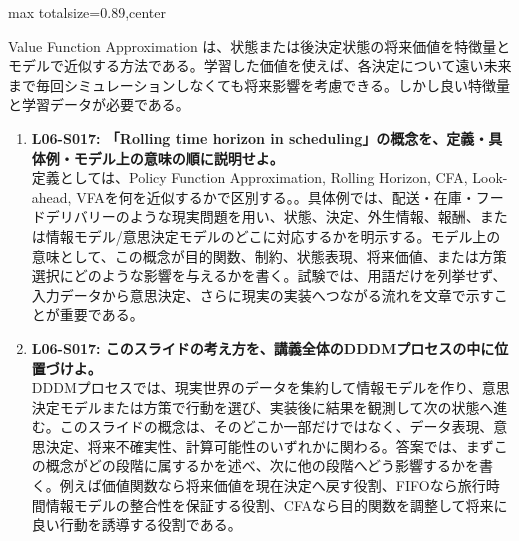 \begin{minipage}[t]{0.58\textwidth}
\begin{adjustbox}{max totalsize={\textwidth}{0.89\textheight},center}
\begin{minipage}{\textwidth}
Value Function Approximation は、状態または後決定状態の将来価値を特徴量とモデルで近似する方法である。学習した価値を使えば、各決定について遠い未来まで毎回シミュレーションしなくても将来影響を考慮できる。しかし良い特徴量と学習データが必要である。\par{}\begin{enumerate}\item \textbf{L06-S017: 「Rolling time horizon in scheduling」の概念を、定義・具体例・モデル上の意味の順に説明せよ。}\\定義としては、Policy Function Approximation, Rolling Horizon, CFA, Look-ahead, VFAを何を近似するかで区別する。。具体例では、配送・在庫・フードデリバリーのような現実問題を用い、状態、決定、外生情報、報酬、または情報モデル/意思決定モデルのどこに対応するかを明示する。モデル上の意味として、この概念が目的関数、制約、状態表現、将来価値、または方策選択にどのような影響を与えるかを書く。試験では、用語だけを列挙せず、入力データから意思決定、さらに現実の実装へつながる流れを文章で示すことが重要である。\item \textbf{L06-S017: このスライドの考え方を、講義全体のDDDMプロセスの中に位置づけよ。}\\DDDMプロセスでは、現実世界のデータを集約して情報モデルを作り、意思決定モデルまたは方策で行動を選び、実装後に結果を観測して次の状態へ進む。このスライドの概念は、そのどこか一部だけではなく、データ表現、意思決定、将来不確実性、計算可能性のいずれかに関わる。答案では、まずこの概念がどの段階に属するかを述べ、次に他の段階へどう影響するかを書く。例えば価値関数なら将来価値を現在決定へ戻す役割、FIFOなら旅行時間情報モデルの整合性を保証する役割、CFAなら目的関数を調整して将来に良い行動を誘導する役割である。\end{enumerate}
\end{minipage}
\end{adjustbox}
\end{minipage}


